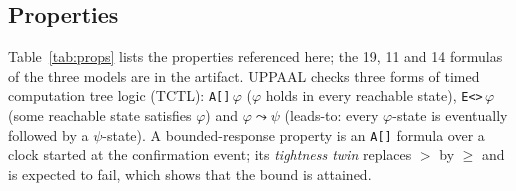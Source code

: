 \documentclass[conference,a4paper]{IEEEtran}
\begin{document}
\subsection{Properties}
\label{sec:props}
Table~\ref{tab:props} lists the properties referenced here; the 19, 11 and 14 formulas of the three models are in the artifact. UPPAAL checks three forms of timed computation tree logic (TCTL): \texttt{A[]}\,$\varphi$ ($\varphi$ holds in every reachable state), \texttt{E<>}\,$\varphi$ (some reachable state satisfies $\varphi$) and $\varphi \leadsto \psi$ (leads-to: every $\varphi$-state is eventually followed by a $\psi$-state). A bounded-response property is an \texttt{A[]} formula over a clock started at the confirmation event; its \emph{tightness twin} replaces $>$ by $\ge$ and is expected to fail, which shows that the bound is attained.
\end{document}
